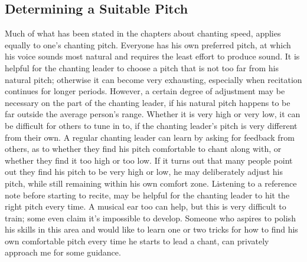 \subsection*{Determining a Suitable Pitch}
\begin{justify}
  Much of what has been stated in the chapters about chanting speed, applies equally to one's chanting pitch. Everyone has his own preferred pitch, at which his voice sounds most natural and requires the least effort to produce sound. It is helpful for the chanting leader to choose a pitch that is not too far from his natural pitch; otherwise it can become very exhausting, especially when recitation continues for longer periods. However, a certain degree of adjustment may be necessary on the part of the chanting leader, if his natural pitch happens to be far outside the average person's range. Whether it is very high or very low, it can be difficult for others to tune in to, if the chanting leader's pitch is very different from their own. A regular chanting leader can learn by asking for feedback from others, as to whether they find his pitch comfortable to chant along with, or whether they find it too high or too low. If it turns out that many people point out they find his pitch to be very high or low, he may deliberately adjust his pitch, while still remaining within his own comfort zone. Listening to a reference note before starting to recite, may be helpful for the chanting leader to hit the right pitch every time. A musical ear too can help, but this is very difficult to train; some even claim it's impossible to develop. Someone who aspires to polish his skills in this area and would like to learn one or two tricks for how to find his own comfortable pitch every time he starts to lead a chant, can privately approach me for some guidance.
\end{justify}

